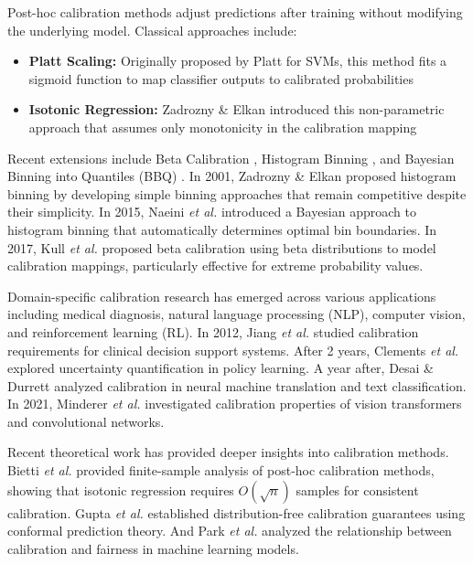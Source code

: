 \documentclass[12pt, a4paper]{article}
\begin{document}
Post-hoc calibration methods adjust predictions after training without modifying the underlying model. Classical approaches include:

\begin{itemize}
    \item \textbf{Platt Scaling:} Originally proposed by Platt \cite{platt1999probabilistic} for SVMs, this method fits a sigmoid function to map classifier outputs to calibrated probabilities
    
    \item \textbf{Isotonic Regression:} Zadrozny \& Elkan \cite{zadrozny2001learning} introduced this non-parametric approach that assumes only monotonicity in the calibration mapping
\end{itemize}

Recent extensions include Beta Calibration \cite{kull2017beta}, Histogram Binning \cite{zadrozny2001obtaining}, and Bayesian Binning into Quantiles (BBQ) \cite{naeini2015obtaining}. In 2001, Zadrozny \& Elkan \cite{zadrozny2001obtaining} proposed histogram binning by developing simple binning approaches that remain competitive despite their simplicity. In 2015, Naeini \emph{et al.} \cite{naeini2015obtaining} introduced a Bayesian approach to histogram binning that automatically determines optimal bin boundaries. In 2017, Kull \emph{et al.} \cite{kull2017beta} proposed beta calibration using beta distributions to model calibration mappings, particularly effective for extreme probability values.  

Domain-specific calibration research has emerged across various applications including medical diagnosis, natural language processing (NLP), computer vision, and reinforcement learning (RL). In 2012, Jiang \emph{et al.} \cite{jiang2012} studied calibration requirements for clinical decision support systems. After 2 years, Clements \emph{et al.} \cite{clements2019} explored uncertainty quantification in policy learning. A year after, Desai \& Durrett \cite{desai2020} analyzed calibration in neural machine translation and text classification. In 2021, Minderer \emph{et al.} \cite{minderer2021} investigated calibration properties of vision transformers and convolutional networks.

Recent theoretical work has provided deeper insights into calibration methods. Bietti \emph{et al.} \cite{bietti2021} provided finite-sample analysis of post-hoc calibration methods, showing that isotonic regression requires $O(\sqrt{n})$ samples for consistent calibration. Gupta \emph{et al.} \cite{gupta2021} established distribution-free calibration guarantees using conformal prediction theory. And Park \emph{et al.} \cite{park2022} analyzed the relationship between calibration and fairness in machine learning models. 
\end{document}
